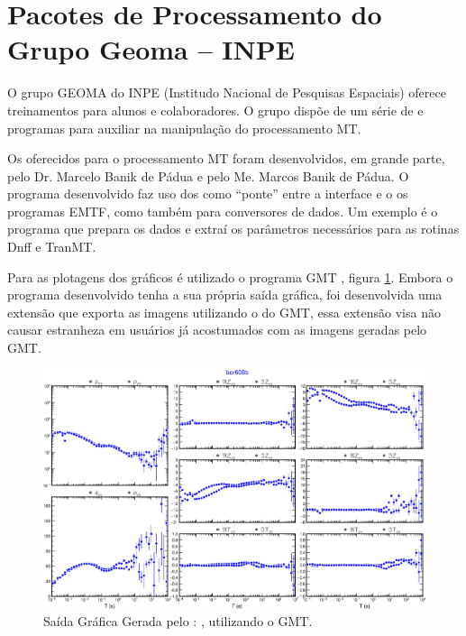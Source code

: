             
      
           
    \section{Pacotes de Processamento do Grupo Geoma -- INPE}
    
        O grupo GEOMA do INPE (Institudo Nacional de Pesquisas Espaciais) oferece treinamentos para alunos e colaboradores. O grupo dispõe de um série de  e programas para auxiliar na manipulação do processamento MT.

        Os  oferecidos para o processamento MT foram desenvolvidos, em grande parte, pelo Dr. Marcelo Banik de Pádua e pelo Me. Marcos Banik de Pádua. O programa desenvolvido faz uso dos  como ``ponte'' entre a interface e o os programas EMTF, como também para conversores de dados. Um exemplo é o programa  que prepara os dados e extraí os parâmetros necessários para as rotinas Dnff e TranMT. 
        
        Para as plotagens dos gráficos é utilizado o programa GMT \cite{gmt}, figura \ref{plot-cmp-tf}. Embora o programa desenvolvido tenha a sua própria saída gráfica, foi desenvolvida uma extensão que exporta as imagens utilizando o  do GMT, essa extensão visa não causar estranheza em usuários já acostumados com as imagens geradas pelo GMT.  
    
        \begin{figure}[H]
            \caption{Saída Gráfica Gerada pelo : , utilizando o GMT.}
                \begin{center}
                    \includegraphics[width=15cm]{texto/figura/plot-cmp-tf.png}
                \end{center}
            \label{plot-cmp-tf}
        \end{figure}

